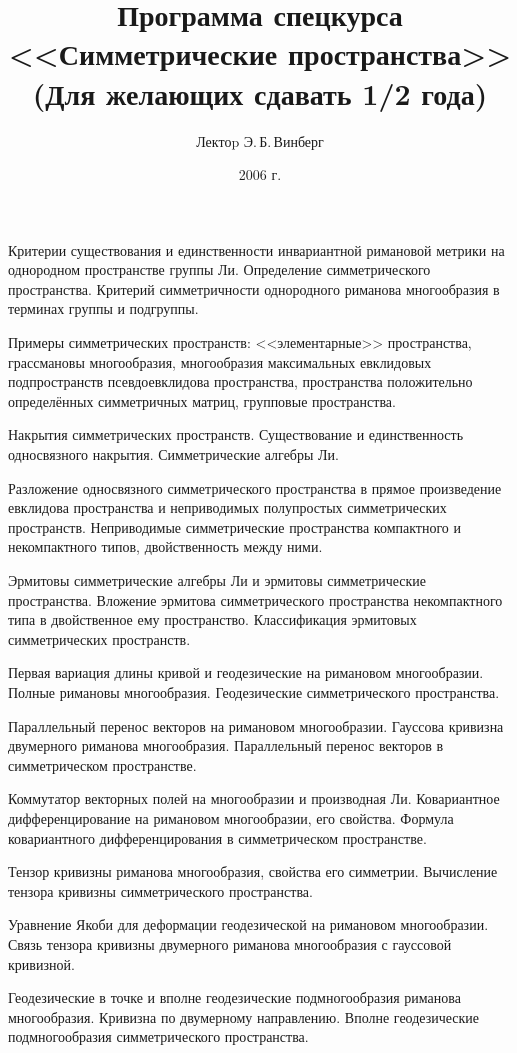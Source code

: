\documentclass[a4paper]{article}
\title{Программа спецкурса <<Симметрические пространства>>\\
(Для желающих сдавать 1/2 года)}
\author{Лектоp Э.\,Б.\,Винберг}
\date{2006 г.}
\begin{document}
\maketitle

\begin{nums}{-2}
\item Критерии существования и единственности инвариантной римановой метрики на однородном пространстве группы
Ли. Определение симметрического пространства. Критерий симметричности однородного риманова многообразия в терминах
группы и подгруппы.
\item Примеры симметрических пространств: <<элементарные>> пространства, грассмановы многообразия, многообразия
максимальных евклидовых подпространств псевдоевклидова пространства, пространства положительно определённых
симметричных матриц, групповые пространства.
\item Накрытия симметрических пространств. Существование и единственность односвязного накрытия. Симметрические
алгебры Ли.
\item Разложение односвязного симметрического пространства в прямое произведение евклидова пространства и
неприводимых полупростых симметрических пространств. Неприводимые симметрические пространства компактного и
некомпактного типов, двойственность между ними.
\item Эрмитовы симметрические алгебры Ли и эрмитовы симметрические пространства. Вложение эрмитова симметрического
пространства некомпактного типа в двойственное ему пространство. Классификация эрмитовых симметрических
пространств.
\item Первая вариация длины кривой и геодезические на римановом многообразии. Полные римановы многообразия.
Геодезические симметрического пространства.
\item Параллельный перенос векторов на римановом многообразии. Гауссова кривизна двумерного риманова многообразия.
Параллельный перенос векторов в симметрическом пространстве.
\item Коммутатор векторных полей на многообразии и производная Ли. Ковариантное дифференцирование на римановом
многообразии, его свойства. Формула ковариантного дифференцирования в симметрическом пространстве.
\item Тензор кривизны риманова многообразия, свойства его симметрии. Вычисление тензора кривизны симметрического
пространства.
\item Уравнение Якоби для деформации геодезической на римановом многообразии. Связь тензора кривизны двумерного
риманова многообразия с гауссовой кривизной.
\item Геодезические в точке и вполне геодезические подмногообразия риманова многообразия. Кривизна по двумерному
направлению. Вполне геодезические подмногообразия симметрического пространства.
\end{nums}

\medskip\dmvntrail
\end{document}
